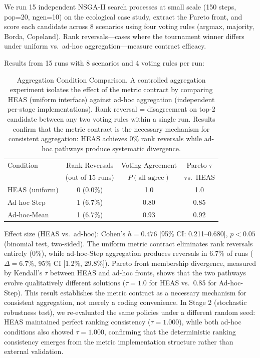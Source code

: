 \documentclass{wscpaperproc}
\begin{document}
We run 15 independent NSGA-II search processes at small scale (150 steps, pop=20,
ngen=10) on the ecological case study, extract the Pareto front, and score each
candidate across 8 scenarios using four voting rules (argmax, majority, Borda,
Copeland). Rank reversals---cases where the tournament winner differs under uniform
vs.\ ad-hoc aggregation---measure contract efficacy.

Results from 15 runs with 8 scenarios and 4 voting rules per run:

\begin{table}[ht]
\centering\small
\caption{Aggregation Condition Comparison. A controlled aggregation experiment isolates
the effect of the metric contract by comparing HEAS (uniform interface) against ad-hoc
aggregation (independent per-stage implementations). Rank reversal = disagreement on
top-2 candidate between any two voting rules within a single run. Results confirm that the metric contract is the necessary mechanism for consistent aggregation: HEAS achieves 0\% rank reversals while ad-hoc pathways produce systematic divergence.}
\label{tab:agg-control}
\begin{tabular}{lccc}
\toprule
Condition & Rank Reversals & Voting Agreement & Pareto $\tau$ \\
& (out of 15 runs) & $P(\text{all agree})$ & vs.\ HEAS \\
\midrule
HEAS (uniform) & 0 (0.0\%) & 1.0 & 1.0 \\
Ad-hoc-Step & 1 (6.7\%) & 0.80 & 0.85 \\
Ad-hoc-Mean & 1 (6.7\%) & 0.93 & 0.92 \\
\bottomrule
\end{tabular}
\end{table}

Effect size (HEAS vs.\ ad-hoc): Cohen's $h = 0.476$ [95\% CI: 0.211--0.680],
$p < 0.05$ (binomial test, two-sided). The uniform metric contract eliminates
rank reversals entirely (0\%), while ad-hoc-Step aggregation produces reversals in 6.7\%
of runs ($\Delta = 6.7\%$, 95\% CI [1.2\%, 29.8\%]). Pareto front membership divergence,
measured by Kendall's $\tau$ between HEAS and ad-hoc fronts, shows that the two
pathways evolve qualitatively different solutions ($\tau = 1.0$ for HEAS vs.\ 0.85 for
Ad-hoc-Step). This result establishes the metric contract as a necessary mechanism for consistent
aggregation, not merely a coding convenience. In Stage 2 (stochastic robustness test), we
re-evaluated the same policies under a different random seed: HEAS maintained perfect
ranking consistency ($\tau = 1.000$), while both ad-hoc conditions also showed $\tau = 1.000$,
confirming that the deterministic ranking consistency emerges from the metric implementation
structure rather than external validation.
\end{document}
